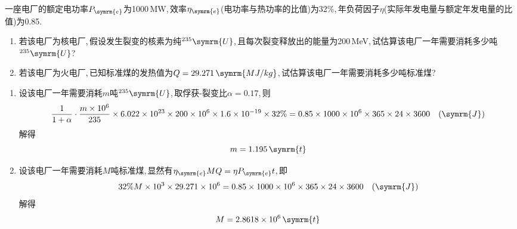 \begin{exercise}
    一座电厂的额定电功率$P_{\symrm{e}}$为1000\,MW,\,效率$\eta_{\symrm{e}}$(电功率与热功率的比值)为32\%,\,年负荷因子$\eta$(实际年发电量与额定年发电量的比值)为0.85.\,
    \begin{enumerate}[(1)]
        \item 若该电厂为核电厂,\,假设发生裂变的核素为纯${}^{235}\symrm{U}$,\,且每次裂变释放出的能量为200\,MeV,\,试估算该电厂一年需要消耗多少吨${}^{235}\symrm{U}$?
        \item 若该电厂为火电厂,\,已知标准煤的发热值为$Q=29.271\,\symrm{MJ/kg}$,\,试估算该电厂一年需要消耗多少吨标准煤?
    \end{enumerate}
    \begin{solution}
        \begin{enumerate}[(1)]
            \item 设该电厂一年需要消耗$m$吨${}^{235}\symrm{U}$,\,取俘获-裂变比$\alpha = 0.17$,\,则
            \begin{equation*}
                \frac{1}{1+\alpha} \cdot \frac{m\times 10^6}{235} \times 6.022 \times 10^{23} \times 200 \times 10^6 \times 1.6 \times 10^{-19} \times 32\% = 0.85 \times 1000 \times 10^6 \times 365 \times 24 \times 3600 \quad (\symrm{J})
            \end{equation*}
            解得
            \begin{equation*}
                m = 1.195\,\symrm{t}
            \end{equation*}
            \item 设该电厂一年需要消耗$M$吨标准煤,\,显然有$\eta_{\symrm{e}} M Q = \eta P_{\symrm{e}} t$,\,即
            \begin{equation*}
                32\% M \times 10^3 \times 29.271 \times 10^6 = 0.85 \times 1000 \times 10^6 \times 365 \times 24 \times 3600 \quad (\symrm{J})
            \end{equation*}
            解得
            \begin{equation*}
                M = 2.8618 \times 10^6\,\symrm{t}
            \end{equation*}
        \end{enumerate}
    \end{solution}
\end{exercise}

